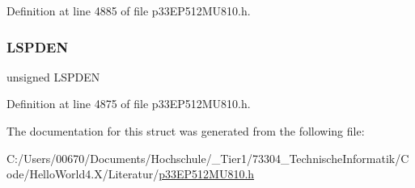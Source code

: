 Definition at line 4885 of file p33\+E\+P512\+M\+U810.\+h.

\mbox{\label{structtag_u1_a_d_d_r_b_i_t_s_aa916ca79a5ee19e099a3f0470086fbe4}} 
\subsubsection{\texorpdfstring{L\+S\+P\+D\+EN}{LSPDEN}}
{\footnotesize\ttfamily unsigned L\+S\+P\+D\+EN}



Definition at line 4875 of file p33\+E\+P512\+M\+U810.\+h.



The documentation for this struct was generated from the following file\+:\begin{DoxyCompactItemize}
\item 
C\+:/\+Users/00670/\+Documents/\+Hochschule/\+\_\+\+Tier1/73304\+\_\+\+Technische\+Informatik/\+Code/\+Hello\+World4.\+X/\+Literatur/\hyperlink{p33_e_p512_m_u810_8h}{p33\+E\+P512\+M\+U810.\+h}\end{DoxyCompactItemize}
